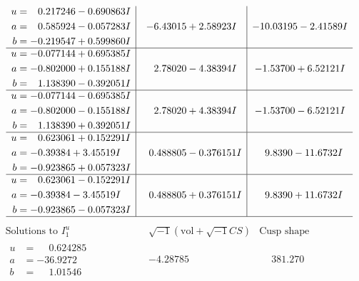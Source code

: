 \documentclass[1p]{elsarticle_modified}
\theoremstyle{definition}
\newcommand{\I}{\sqrt{-1}}
\begin{document}
$$\begin{array}{c|c|c}
\begin{aligned}
u &= \phantom{-}0.217246 - 0.690863 I \\
a &= \phantom{-}0.585924 - 0.057283 I \\
b &= -0.219547 + 0.599860 I\end{aligned}
 & -6.43015 + 2.58923 I & -10.03195 - 2.41589 I \\ \hline\begin{aligned}
u &= -0.077144 + 0.695385 I \\
a &= -0.802000 + 0.155188 I \\
b &= \phantom{-}1.138390 - 0.392051 I\end{aligned}
 & \phantom{-}2.78020 - 4.38394 I & -1.53700 + 6.52121 I \\ \hline\begin{aligned}
u &= -0.077144 - 0.695385 I \\
a &= -0.802000 - 0.155188 I \\
b &= \phantom{-}1.138390 + 0.392051 I\end{aligned}
 & \phantom{-}2.78020 + 4.38394 I & -1.53700 - 6.52121 I \\ \hline\begin{aligned}
u &= \phantom{-}0.623061 + 0.152291 I \\
a &= -0.39384 + 3.45519 I \\
b &= -0.923865 + 0.057323 I\end{aligned}
 & \phantom{-}0.488805 - 0.376151 I & \phantom{-}9.8390 - 11.6732 I \\ \hline\begin{aligned}
u &= \phantom{-}0.623061 - 0.152291 I \\
a &= -0.39384 - 3.45519 I \\
b &= -0.923865 - 0.057323 I\end{aligned}
 & \phantom{-}0.488805 + 0.376151 I & \phantom{-}9.8390 + 11.6732 I\\
 \hline 
 \end{array}$$\newpage$$\begin{array}{c|c|c}  
\text{Solutions to }I^u_{1}& \I (\text{vol} + \sqrt{-1}CS) & \text{Cusp shape}\\
 \hline 
\begin{aligned}
u &= \phantom{-}0.624285\phantom{ +0.000000I} \\
a &= -36.9272\phantom{ +0.000000I} \\
b &= \phantom{-}1.01546\phantom{ +0.000000I}\end{aligned}
 & -4.28785\phantom{ +0.000000I} & \phantom{-}381.270\phantom{ +0.000000I} \\ \hline\begin{aligned}

\end{aligned}
\end{array}$$
\end{document}
